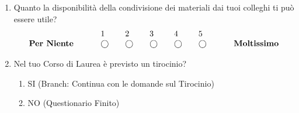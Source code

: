 \begin{enumerate}
    \item Quanto la disponibilità della condivisione dei materiali dai tuoi colleghi ti può essere utile?
    \begin{equation*}
        \begin{array}{lllllll}
                        &  1 & 2 & 3 & 4 & 5 & \\
    \text { \textbf{Per Niente} } \quad \quad & \bigcirc \quad& \bigcirc \quad& \bigcirc \quad& \bigcirc \quad& \bigcirc \quad& \quad \text { \textbf{Moltissimo} }
        \end{array}
    \end{equation*}

    \item Nel tuo Corso di Laurea è previsto un tirocinio?
    \begin{enumerate}
        \item SI (Branch: Continua con le domande sul Tirocinio)
        \item NO (Questionario Finito)
    \end{enumerate}
\end{enumerate}

